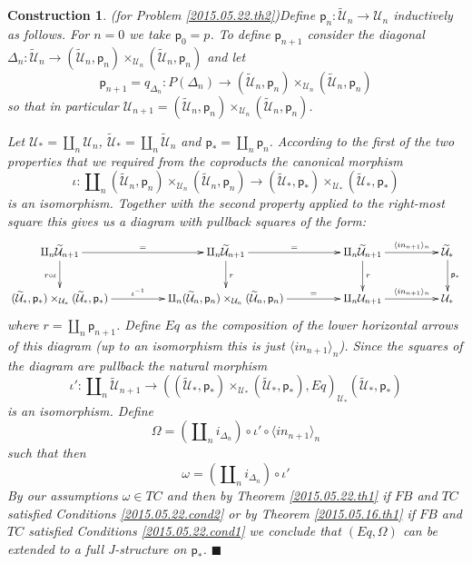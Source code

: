 \documentclass[12pt]{article}
\numberwithin{equation}{section}
\newtheorem{construction0}[proposition]{Construction}
\newenvironment{construction}[1]{\begin{construction0}(for Problem \ref{#1})}{$\blacksquare$ \end{construction0}}
\newcommand{\llabel}[1]{\label{#1}}
\newcommand{\sr}{\rightarrow}
\newcommand{\wt}{\widetilde}
\newcommand{\p}{\mathsf{p}}
\newcommand{\U}{\mathcal{U}}
\begin{document}
%
\begin{construction}{2015.05.22.th2}\rm\llabel{2015.05.23.constr1}
Define $\p_n:\wt{\U}_n\sr \U_n$ inductively as follows. For $n=0$ we take
$\p_0=p$. To define $\p_{n+1}$ consider the diagonal $\Delta_n:\wt{\U}_n\sr
(\wt{\U}_n,\p_n)\times_{\U_n}(\wt{\U}_n,\p_n)$ and let
%
$$\p_{n+1}=q_{\Delta_n}:P(\Delta_n)\sr
(\wt{\U}_n,\p_n)\times_{\U_n}(\wt{\U}_n,\p_n)$$
%
so that in particular $\U_{n+1}=(\wt{\U}_n,\p_n)\times_{\U_n}(\wt{\U}_n,\p_n)$.

Let $\U_*=\amalg_n \U_n$, $\wt{\U}_*=\amalg_n\wt{\U}_n$ and $\p_*=\amalg_n
\p_n$. According to the first of the two properties that we required from the
coproducts the canonical morphism
%
$$\iota:\amalg_n (\wt{\U}_n,\p_n)\times_{\U_n}(\wt{\U}_n,\p_n)\sr
(\wt{\U}_*,\p_*)\times_{\U_*}(\wt{\U}_*,\p_*)$$
%
is an isomorphism. Together with the second property applied to the right-most
square this gives us a diagram with pullback squares of the form:
%
$$
\begin{xy}
          \xymatrix@C=4pc{
                 \amalg_n\wt{\U}_{n+1}  \ar[r]^-{=} \ar[d]_{r\circ \iota} & 
                 \amalg_n\wt{\U}_{n+1} \ar[r]^-{=} \ar[d]^{r} &
		 \amalg_n\wt{\U}_{n+1} \ar[r]^-{\langle in_{n+1} \rangle_{n}} \ar[d]^{r} &
		\wt{\U}_* \ar[d]^{\p_*} \\
		(\wt{\U}_*,\p_*)\times_{\U_*}(\wt{\U}_*,\p_*) \ar[r]^-{\iota^{-1}} &
		\amalg_n (\wt{\U}_n,\p_n)\times_{\U_n}(\wt{\U}_n,\p_n) \ar[r]^-{=} &
		\amalg_n \U_{n+1} \ar[r]^-{\langle in_{n+1} \rangle_{n}} &
		\U_*
                }
\end{xy}
$$
%
where  $r=\amalg_n  \p_{n+1}$. Define  $Eq$  as  the  composition of  the  lower
horizontal arrows of  this diagram (up to an isomorphism  this is just $\langle
in_{n+1}\rangle_{n}$).  Since  the squares  of  the  diagram are  pullback  the
natural morphism
%
$$\iota':\amalg_n\wt{\U}_{n+1}\sr
((\wt{\U}_*,\p_*)\times_{\U_*}(\wt{\U}_*,\p_*),Eq)_{\U_*} (\wt{\U}_*,\p_*)$$
%
is an isomorphism. Define
%
$$\Omega=(\amalg_n    i_{\Delta_n})\circ     \iota'\circ    \langle    in_{n+1}
\rangle_{n}$$
%
such that then
%
$$\omega=(\amalg_n i_{\Delta_n})\circ \iota'$$
%
By our assumptions  $\omega\in TC$ and then by  Theorem \ref{2015.05.22.th1} if
$FB$  and  $TC$  satisfied  Conditions  \ref{2015.05.22.cond2}  or  by  Theorem
\ref{2015.05.16.th1}     if    $FB$     and    $TC$     satisfied    Conditions
\ref{2015.05.22.cond1} we conclude that $(Eq,\Omega)$ can be extended to a full
J-structure on $\p_*$.
\end{construction}
%
\end{document}
